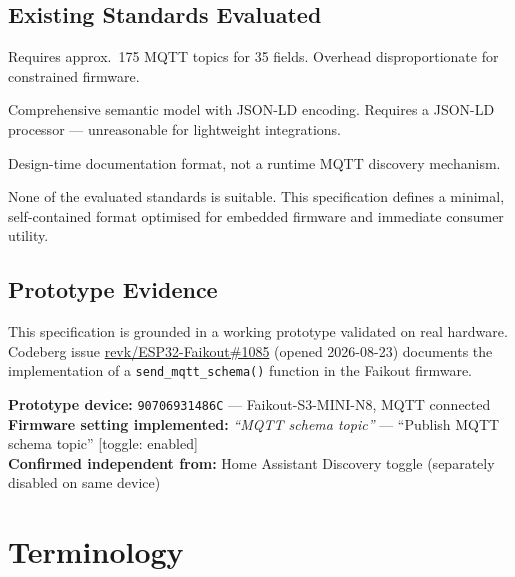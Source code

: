 \documentclass[11pt,a4paper]{article}
\begin{document}
\subsection{Existing Standards Evaluated}

\begin{description}[leftmargin=2cm, style=nextline]
  \item[Homie v4.0] Requires approx.\ 175 MQTT topics for 35 fields. Overhead disproportionate for constrained firmware.
  \item[W3C WoT TD] Comprehensive semantic model with JSON-LD encoding. Requires a JSON-LD processor — unreasonable for lightweight integrations.
  \item[AsyncAPI] Design-time documentation format, not a runtime MQTT discovery mechanism.
\end{description}

None of the evaluated standards is suitable. This specification defines a minimal, self-contained format optimised for embedded firmware and immediate consumer utility.

\subsection{Prototype Evidence}

This specification is grounded in a working prototype validated on real hardware. Codeberg issue \href{https://codeberg.org/revk/ESP32-Faikout/issues/1085}{revk/ESP32-Faikout\#1085} (opened 2026-08-23) documents the implementation of a \texttt{send\_mqtt\_schema()} function in the Faikout firmware.

\begin{infobox}
\textbf{Prototype device:} \texttt{90706931486C} — Faikout-S3-MINI-N8, MQTT connected\\
\textbf{Firmware setting implemented:} \emph{``MQTT schema topic''} — ``Publish MQTT schema topic'' [toggle: enabled]\\
\textbf{Confirmed independent from:} Home Assistant Discovery toggle (separately disabled on same device)
\end{infobox}

\section{Terminology}
\end{document}

